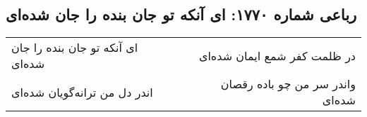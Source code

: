 \begin{center}
\section*{رباعی شماره ۱۷۷۰: ای آنکه تو جان بنده را جان شده‌ای}
\label{sec:1770}
\begin{longtable}{l p{0.5cm} r}
ای آنکه تو جان بنده را جان شده‌ای
&&
در ظلمت کفر شمع ایمان شده‌ای
\\
اندر دل من ترانه‌گویان شده‌ای
&&
واندر سر من چو باده رقصان شده‌ای
\\
\end{longtable}
\end{center}
